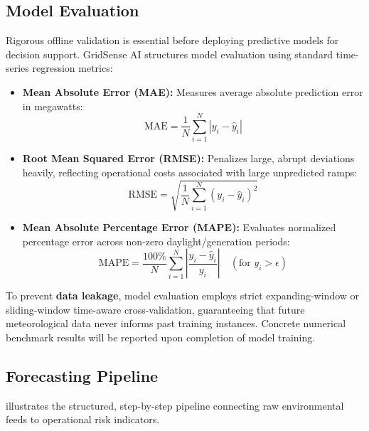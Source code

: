 \subsection{Model Evaluation}
\label{subsec:model_evaluation}

Rigorous offline validation is essential before deploying predictive models for decision support. GridSense AI structures model evaluation using standard time-series regression metrics:
\begin{itemize}[leftmargin=1.8em, itemsep=0.2em]
    \item \textbf{Mean Absolute Error (MAE):} Measures average absolute prediction error in megawatts:
    \begin{equation}
        \text{MAE} = \frac{1}{N} \sum_{i=1}^N |y_i - \hat{y}_i|
    \end{equation}
    \item \textbf{Root Mean Squared Error (RMSE):} Penalizes large, abrupt deviations heavily, reflecting operational costs associated with large unpredicted ramps:
    \begin{equation}
        \text{RMSE} = \sqrt{\frac{1}{N} \sum_{i=1}^N (y_i - \hat{y}_i)^2}
    \end{equation}
    \item \textbf{Mean Absolute Percentage Error (MAPE):} Evaluates normalized percentage error across non-zero daylight/generation periods:
    \begin{equation}
        \text{MAPE} = \frac{100\%}{N} \sum_{i=1}^N \left| \frac{y_i - \hat{y}_i}{y_i} \right| \quad (\text{for } y_i > \epsilon)
    \end{equation}
\end{itemize}

To prevent \textbf{data leakage}, model evaluation employs strict expanding-window or sliding-window time-aware cross-validation, guaranteeing that future meteorological data never informs past training instances. Concrete numerical benchmark results will be reported upon completion of model training.

\subsection{Forecasting Pipeline}
\label{subsec:forecasting_pipeline}

 illustrates the structured, step-by-step pipeline connecting raw environmental feeds to operational risk indicators.

